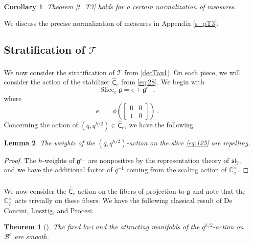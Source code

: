 \documentclass[14pt]{extarticle}
\newcommand{\Ct}{\mathbb{C}^\times}
\newcommand{\sP}{\mathsf{P}}
\newcommand{\bCh}{\widehat{\mathsf{C}}}
\newcommand{\cT}{\mathscr{T}}
\newcommand{\cB}{\mathscr{B}}
\newcommand{\fg}{\mathfrak{g}}
\DeclareMathOperator{\Slice}{Slice}
\newtheorem{Theorem}{Theorem}
\newtheorem{Lemma}{Lemma}[section]
\newtheorem{Corollary}[Lemma]{Corollary}
\theoremstyle{definition}
\begin{document}
\begin{Corollary}\label{c_T3}
  Theorem \ref{t_T3} holds for a certain
  normalization of measures. 
\end{Corollary}

\noindent 
We discuss the precise normalization of measures in Appendix 
\ref{s_pT3}. 


\subsection{Stratification of $\cT$}


\subsubsection{}

We now consider the stratification of $\cT$ from \eqref{decTau1}. On
each piece, we will consider the action of the stabilizer $\bCh_e$
from \eqref{eq:28}. We begin with 
%
\begin{equation}
\Slice_e \fg = e + \fg^{e_-}\label{eq:125}\,, 
\end{equation}
%
where
\[
  e_- = \phi \left(
  \begin{bmatrix}
    0 & 0 \\ 1 & 0 
  \end{bmatrix}
\right)\,. 
\]
Concerning the action of $(q,q^{h/2})  \in \bCh_e$, we
have the following 

\begin{Lemma}\label{l_slice} 
The weights of the $(q,q^{h/2})$-action on the slice
\eqref{eq:125} are repelling. 
\end{Lemma}

\begin{proof}
The $h$-weights of $\fg^{e_-}$ are nonpositive by the representation
theory of $\mathfrak{sl}_2$, and we have the additional factor of $q^{-1}$
coming from the scaling action of $\Ct_q$. 
\end{proof}

\subsubsection{}
We now consider the $\bCh_e$-action on the
fibers of projection to $\fg$ and note that the $\Ct_q$ acts trivially
on these fibers. We have the following classical
result of De Concini, Lusztig, and Procesi. 

\begin{Theorem}[\cite{dCLP}]\label{t_dCLP} The fixed loci and the attracting
  manifolds of the $q^{h/2}$-action on $\cB^e$ are smooth.
\end{Theorem}
\end{document}
